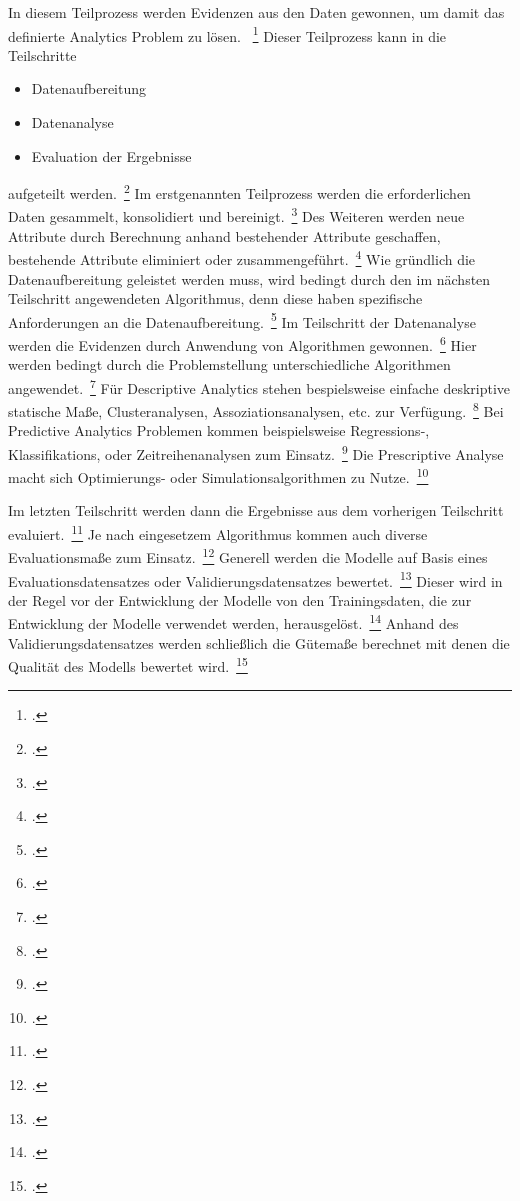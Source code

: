 In diesem Teilprozess werden Evidenzen aus den Daten gewonnen, um damit das definierte Analytics Problem zu lösen.
~\footcite[\vglf][]{seiter.2019}
Dieser Teilprozess kann in die Teilschritte
\begin{itemize}
    \item Datenaufbereitung
    \item Datenanalyse
    \item Evaluation der Ergebnisse
\end{itemize}
aufgeteilt werden.~\footcite[\vglf][]{seiter.2019}
Im erstgenannten Teilprozess werden die erforderlichen Daten gesammelt, konsolidiert und bereinigt.~\footcite[\vglf]
[]{seiter.2019}
Des Weiteren werden neue Attribute durch Berechnung anhand bestehender Attribute geschaffen, bestehende Attribute eliminiert
oder zusammengeführt.~\footcite[\vglf][]{seiter.2019}
Wie gründlich die Datenaufbereitung geleistet werden muss, wird bedingt durch den im nächsten Teilschritt angewendeten
Algorithmus, denn diese haben spezifische Anforderungen an die Datenaufbereitung.~\footcite[\vglf][]{seiter.2019}
Im Teilschritt der Datenanalyse werden die Evidenzen durch Anwendung von Algorithmen gewonnen.~\footcite[\vglf]
[]{seiter.2019}
Hier werden bedingt durch die Problemstellung unterschiedliche Algorithmen angewendet.~\footcite[\vglf]
[]{seiter.2019}
Für Descriptive Analytics stehen bespielsweise einfache deskriptive statische Maße, Clusteranalysen, Assoziationsanalysen, etc.
zur Verfügung.~\footcite[\vglf][]{seiter.2019}
Bei Predictive Analytics Problemen kommen beispielsweise Regressions-, Klassifikations, oder Zeitreihenanalysen zum
Einsatz.~\footcite[\vglf][]{seiter.2019}
Die Prescriptive Analyse macht sich Optimierungs- oder Simulationsalgorithmen zu Nutze.~\footcite[\vglf][]{seiter.2019}

Im letzten Teilschritt werden dann die Ergebnisse aus dem vorherigen Teilschritt evaluiert.~\footcite[\vglf][]
{seiter.2019}
Je nach eingesetzem Algorithmus kommen auch diverse Evaluationsmaße zum Einsatz.~\footcite[\vglf][]{seiter.2019}
Generell werden die Modelle auf Basis eines Evaluationsdatensatzes oder Validierungsdatensatzes bewertet.~\footcite[\vglf]
[]{seiter.2019}
Dieser wird in der Regel vor der Entwicklung der Modelle von den Trainingsdaten, die zur Entwicklung der Modelle verwendet werden,
herausgelöst.~\footcite[\vglf][]{seiter.2019}
Anhand des Validierungsdatensatzes werden schließlich die Gütemaße berechnet mit denen die Qualität des Modells bewertet
wird.~\footcite[\vglf][]{seiter.2019}

